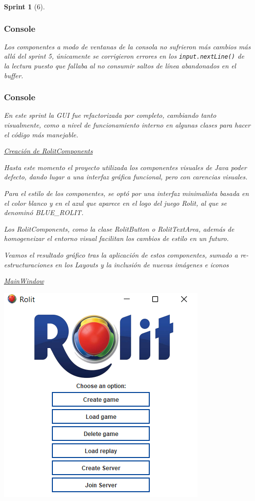 \documentclass{article}
\theoremstyle{break}
\newtheorem*{sprint}{Sprint}
\begin{document}
\begin{sprint}[6]
\subsubsection{Console}
Los componentes a modo de ventanas de la consola no sufrieron más cambios más allá del sprint 5, únicamente se corrigieron errores en los \texttt{input.nextLine()} de la lectura puesto que fallaba al no consumir saltos de línea abandonados en el buffer.

\subsubsection{Console}

En este sprint la GUI fue refactorizada por completo, cambiando tanto visualmente, como a nivel de funcionamiento interno en algunas clases para hacer el código más manejable.

\underline{Creación de RolitComponents}

Hasta este momento el proyecto utilizada los componentes visuales de Java poder defecto, dando lugar a una interfaz gráfica funcional, pero con carencias visuales.

Para el estilo de los componentes, se optó por una interfaz minimalista basada en el color blanco y en el azul que aparece en el logo del juego Rolit, al que se denominó \textit{BLUE\_ROLIT}.

Los \textit{RolitComponents}, como la clase \textit{RolitButton} o \textit{RolitTextArea}, además de homogeneizar el entorno visual facilitan los cambios de estilo en un futuro.

Veamos el resultado gráfico tras la aplicación de estos componentes, sumado a re-estructuraciones en los Layouts y la inclusión de nuevas imágenes e iconos

\underline{MainWindow}
\begin{center}
\includegraphics[scale=1]{menu-sprint-6.png}


\end{center}
\end{sprint}
\end{document}
